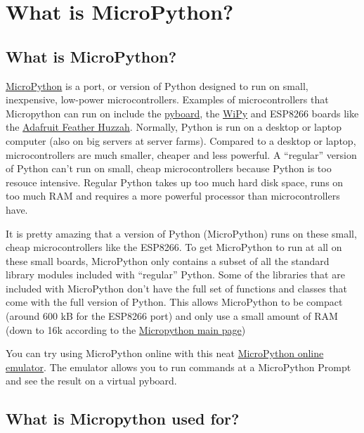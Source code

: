 \documentclass{book}
\begin{document}
    \section{What is MicroPython?}\label{what-is-micropython}

    \subsection{What is MicroPython?}\label{what-is-micropython}

    \href{http://micropython.org/}{MicroPython} is a port, or version of
Python designed to run on small, inexpensive, low-power
microcontrollers. Examples of microcontrollers that Micropython can run
on include the \href{https://store.micropython.org/}{pyboard}, the
\href{https://pycom.io/development-boards}{WiPy} and ESP8266 boards like
the
\href{https://learn.adafruit.com/adafruit-feather-huzzah-esp8266}{Adafruit
Feather Huzzah}. Normally, Python is run on a desktop or laptop computer
(also on big servers at server farms). Compared to a desktop or laptop,
microcontrollers are much smaller, cheaper and less powerful. A
``regular'' version of Python can't run on small, cheap microcontrollers
because Python is too resouce intensive. Regular Python takes up too
much hard disk space, runs on too much RAM and requires a more powerful
processor than microcontrollers have.

It is pretty amazing that a version of Python (MicroPython) runs on
these small, cheap microcontrollers like the ESP8266. To get MicroPython
to run at all on these small boards, MicroPython only contains a subset
of all the standard library modules included with ``regular'' Python.
Some of the libraries that are included with MicroPython don't have the
full set of functions and classes that come with the full version of
Python. This allows MicroPython to be compact (around 600 kB for the
ESP8266 port) and only use a small amount of RAM (down to 16k according
to the \href{https://micropython.org/}{Micropython main page})

You can try using MicroPython online with this neat
\href{https://micropython.org/unicorn/}{MicroPython online emulator}.
The emulator allows you to run commands at a MicroPython Prompt and see
the result on a virtual pyboard.

    \subsection{What is Micropython used
for?}\label{what-is-micropython-used-for}
\end{document}
